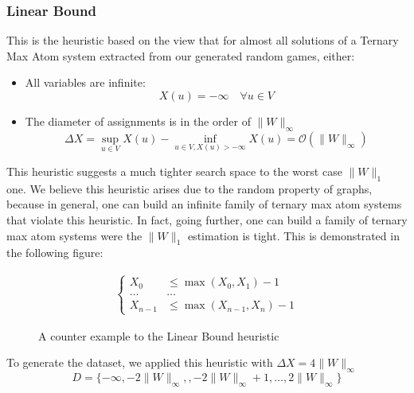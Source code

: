 \subsubsection{Linear Bound}
This is the heuristic based on the view that for almost all solutions of a Ternary Max Atom system extracted from our generated random games, either:
\begin{itemize}
	\item All variables are infinite: 
	$$
	X(u)=-\infty \quad \forall u\in V$$
	\item The diameter of assignments is in the order of $\lVert W\rVert_{\infty}$
	$$
	\Delta X = \sup_{u\in V}X(u)-\inf_{u\in V,X(u)>-\infty}X(u)= \mathcal{O}(\lVert W\rVert_{\infty})$$
\end{itemize}
This heuristic suggests a much tighter search space to the worst case $\lVert W \rVert_{1}$ one. 
\newline
We believe this heuristic arises due to the random property of graphs, because in general, one can build an infinite family of ternary max atom systems that violate this heuristic. \newline In fact, going further, one can build a family of ternary max atom systems were the $\lVert W \rVert_{1}$ estimation is tight. This is demonstrated in the following figure:
\begin{figure}[H]
	\begin{align*}
		\begin{cases}
			X_0 &\le \max(X_{0},X_{1}) -1 \\
			\dots  & \dots \\
			X_{n-1} & \le \max(X_{n-1},X_{n})-1
		\end{cases}
	\end{align*}
	\caption{A counter example to the Linear Bound heuristic}
\end{figure}
\FloatBarrier
To generate the dataset, we applied this heuristic with $\Delta X=4\lVert W\rVert_{\infty}$
$$
D = \{-\infty,-2 \lVert W\rVert_{\infty},,-2 \lVert W\rVert_{\infty}+1 ,\dots ,2\lVert W\rVert_{\infty} \}
$$

